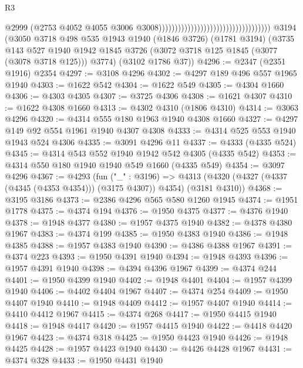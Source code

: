 \begin{lexlean}{R3}
\begin{coremodule}
                                                                        @2999
                                                                        (@2753
                                                                          @4052
                                                                          @4055
                                                                          @3006
                                                                          @3008)))))))))))))))))))))))))))))))))))
    @3194
    (@3050
      @3718
      @498
      @535
      @1943
      @1940
      (@1846 @3726)
      (@1781 @3194)
      (@3735
        @143
        @527
        @1940
        @1942
        @1845
        @3726
        (@3072 @3718 @125 @1845 (@3077 (@3078 @3718 @125)))
        @3774)
      (@3102 @1786 @37))
@4296 := @2347 (@2351 @1916) @2354
@4297 := @3108 @4296
@4302 := @4297 @189 @496 @557 @1965 @1940
@4303 := @1622 @542
@4304 := @1622 @549
@4305 := @4304 @1660
@4306 := @4303 @4305
@4307 := @3725 @4306
@4308 := @1621 @4307
@4310 := @1622 @4308 @1660
@4313 := @4302 @4310 (@1806 @4310)
@4314 := @3063 @4296
@4320 := @4314 @555 @180 @1963 @1940 @4308 @1660
@4327 := @4297 @149 @92 @554 @1961 @1940 @4307 @4308
@4333 := @4314 @525 @553 @1940 @1943 @524 @4306
@4335 := @3091 @4296 @11
@4337 := @4333 (@4335 @524)
@4345 := @4314 @543 @552 @1940 @1942 @542 @4305 (@4335 @542)
@4353 := @4314 @550 @180 @1940 @1940 @549 @1660 (@4335 @549)
@4354 := @3097 @4296
@4367 := @4293
    (fun ("_" : @3196) =>
    @4313 (@4320 (@4327 (@4337 (@4345 (@4353 @4354))) (@3175 @4307)) @4354) (@3181 @4310))
@4368 := @3195 @3186
@4373 := @2386 @4296 @565 @580 @1260 @1945
@4374 := @1951 @1778
@4375 := @4374 @194
@4376 := @1950 @4375
@4377 := @4376 @1940
@4378 := @1948 @4377
@4380 := @1957 @4375 @1940
@4382 := @4378 @4380 @1967
@4383 := @4374 @199
@4385 := @1950 @4383 @1940
@4386 := @1948 @4385
@4388 := @1957 @4383 @1940
@4390 := @4386 @4388 @1967
@4391 := @4374 @223
@4393 := @1950 @4391 @1940
@4394 := @1948 @4393
@4396 := @1957 @4391 @1940
@4398 := @4394 @4396 @1967
@4399 := @4374 @244
@4401 := @1950 @4399 @1940
@4402 := @1948 @4401
@4404 := @1957 @4399 @1940
@4406 := @4402 @4404 @1967
@4407 := @4374 @254
@4409 := @1950 @4407 @1940
@4410 := @1948 @4409
@4412 := @1957 @4407 @1940
@4414 := @4410 @4412 @1967
@4415 := @4374 @268
@4417 := @1950 @4415 @1940
@4418 := @1948 @4417
@4420 := @1957 @4415 @1940
@4422 := @4418 @4420 @1967
@4423 := @4374 @318
@4425 := @1950 @4423 @1940
@4426 := @1948 @4425
@4428 := @1957 @4423 @1940
@4430 := @4426 @4428 @1967
@4431 := @4374 @328
@4433 := @1950 @4431 @1940

\end{coremodule}
\end{lexlean}
